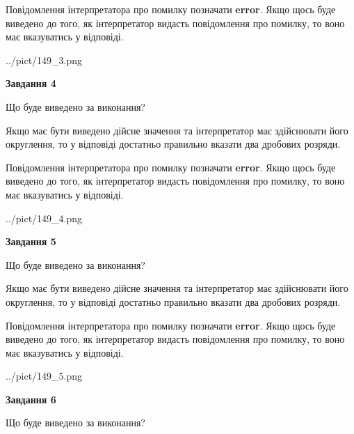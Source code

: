 \documentclass[12pt, ukrainian]{article}
\begin{document}
{\begin {Large}
Повідомлення інтерпретатора про помилку позначати \textbf{error}.
Якщо щось буде виведено до того, як інтерпретатор видасть повідомлення про помилку, 
то воно має вказуватись у відповіді. \par

\begin{center}
	{../pict/149_3.png}
\end{center}
\newpage

{\begin {center}\textbf{Завдання 4}\end {center}}\par
Що буде виведено за виконання? \par

Якщо має бути виведено дійсне значення та інтерпретатор має здійснювати його округлення, 
то у відповіді достатньо правильно вказати два дробових розряди.

Повідомлення інтерпретатора про помилку позначати \textbf{error}.
Якщо щось буде виведено до того, як інтерпретатор видасть повідомлення про помилку, 
то воно має вказуватись у відповіді. \par

\begin{center}
	{../pict/149_4.png}
\end{center}
\newpage

{\begin {center}\textbf{Завдання 5}\end {center}}\par
Що буде виведено за виконання? \par

Якщо має бути виведено дійсне значення та інтерпретатор має здійснювати його округлення, 
то у відповіді достатньо правильно вказати два дробових розряди.

Повідомлення інтерпретатора про помилку позначати \textbf{error}.
Якщо щось буде виведено до того, як інтерпретатор видасть повідомлення про помилку, 
то воно має вказуватись у відповіді. \par

\begin{center}
	{../pict/149_5.png}
\end{center}
\newpage

{\begin {center}\textbf{Завдання 6}\end {center}}\par
Що буде виведено за виконання? \par


\end{Large}}
\end{document}
